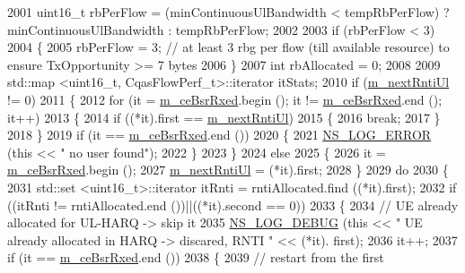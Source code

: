 \begin{DoxyCode}
2001   uint16\_t rbPerFlow = (minContinuousUlBandwidth < tempRbPerFlow) ? minContinuousUlBandwidth : 
      tempRbPerFlow;
2002 
2003   \textcolor{keywordflow}{if} (rbPerFlow < 3)
2004     \{
2005       rbPerFlow = 3;  \textcolor{comment}{// at least 3 rbg per flow (till available resource) to ensure TxOpportunity >= 7
       bytes}
2006     \}
2007   \textcolor{keywordtype}{int} rbAllocated = 0;
2008 
2009   std::map <uint16\_t, CqasFlowPerf\_t>::iterator itStats;
2010   \textcolor{keywordflow}{if} (\hyperlink{classns3_1_1CqaFfMacScheduler_adc4185e06ef2d451669d3b1b4f0d7760}{m\_nextRntiUl} != 0)
2011     \{
2012       \textcolor{keywordflow}{for} (it = \hyperlink{classns3_1_1CqaFfMacScheduler_ae2ec92c28a8adb7f5d63d658fd1e3949}{m\_ceBsrRxed}.begin (); it != \hyperlink{classns3_1_1CqaFfMacScheduler_ae2ec92c28a8adb7f5d63d658fd1e3949}{m\_ceBsrRxed}.end (); it++)
2013         \{
2014           \textcolor{keywordflow}{if} ((*it).first == \hyperlink{classns3_1_1CqaFfMacScheduler_adc4185e06ef2d451669d3b1b4f0d7760}{m\_nextRntiUl})
2015             \{
2016               \textcolor{keywordflow}{break};
2017             \}
2018         \}
2019       \textcolor{keywordflow}{if} (it == \hyperlink{classns3_1_1CqaFfMacScheduler_ae2ec92c28a8adb7f5d63d658fd1e3949}{m\_ceBsrRxed}.end ())
2020         \{
2021           \hyperlink{group__logging_ga0261a8db1d4ac5f79417d117634fd455}{NS\_LOG\_ERROR} (\textcolor{keyword}{this} << \textcolor{stringliteral}{" no user found"});
2022         \}
2023     \}
2024   \textcolor{keywordflow}{else}
2025     \{
2026       it = \hyperlink{classns3_1_1CqaFfMacScheduler_ae2ec92c28a8adb7f5d63d658fd1e3949}{m\_ceBsrRxed}.begin ();
2027       \hyperlink{classns3_1_1CqaFfMacScheduler_adc4185e06ef2d451669d3b1b4f0d7760}{m\_nextRntiUl} = (*it).first;
2028     \}
2029   \textcolor{keywordflow}{do}
2030     \{
2031       std::set <uint16\_t>::iterator itRnti = rntiAllocated.find ((*it).first);
2032       \textcolor{keywordflow}{if} ((itRnti != rntiAllocated.end ())||((*it).second == 0))
2033         \{
2034           \textcolor{comment}{// UE already allocated for UL-HARQ -> skip it}
2035           \hyperlink{group__logging_ga413f1886406d49f59a6a0a89b77b4d0a}{NS\_LOG\_DEBUG} (\textcolor{keyword}{this} << \textcolor{stringliteral}{" UE already allocated in HARQ -> discared, RNTI "} << (*it).
      first);
2036           it++;
2037           \textcolor{keywordflow}{if} (it == \hyperlink{classns3_1_1CqaFfMacScheduler_ae2ec92c28a8adb7f5d63d658fd1e3949}{m\_ceBsrRxed}.end ())
2038             \{
2039               \textcolor{comment}{// restart from the first}

\end{DoxyCode}
